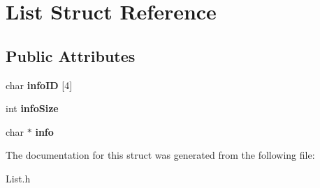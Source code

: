 \hypertarget{structList}{}\section{List Struct Reference}
\label{structList}
\subsection*{Public Attributes}
\begin{DoxyCompactItemize}
\item 
\mbox{\label{structList_a11c192d98d4c47a4464957d57706cded}} 
char {\bfseries info\+ID} \mbox{[}4\mbox{]}
\item 
\mbox{\label{structList_af66bdb027f2f2679d8a12223e1ba1380}} 
int {\bfseries info\+Size}
\item 
\mbox{\label{structList_adf58df5ffd32a14eca080005f2ef6320}} 
char $\ast$ {\bfseries info}
\end{DoxyCompactItemize}


The documentation for this struct was generated from the following file\+:\begin{DoxyCompactItemize}
\item 
List.\+h\end{DoxyCompactItemize}
